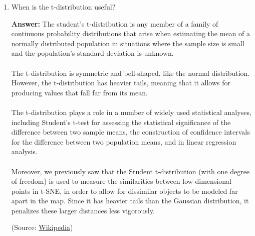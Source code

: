 \documentclass{article}
\newenvironment{QandA}{\begin{enumerate}[label=\arabic*.]}{\end{enumerate}}
\newenvironment{answer}{\par\normalfont \textbf{Answer:}}{}
\begin{document}
\begin{QandA}
    \item When is the t-distribution useful?
    \begin{answer}
        The student's t-distribution is any member of a family of continuous probability distributions that arise when estimating the mean of a normally distributed population in situations where the sample size is small and the population's standard deviation is unknown.\\\\
        The t-distribution is symmetric and bell-shaped, like the normal distribution. However, the t-distribution has heavier tails, meaning that it allows for producing values that fall far from its mean.\\\\
        The t-distribution plays a role in a number of widely used statistical analyses, including Student's t-test for assessing the statistical significance of the difference between two sample means, the construction of confidence intervals for the difference between two population means, and in linear regression analysis. \\\\
        Moreover, we previously saw that the Student t-distribution (with one degree of freedom) is used to measure the similarities between low-dimensional points in t-SNE, in order to allow for dissimilar objects to be modeled far apart in the map. Since it has heavier tails than the Gaussian distribution, it penalizes these larger distances less vigorously. 
        
        (Source: \href{https://en.wikipedia.org/wiki/Student%27s_t-distribution}{Wikipedia})
    \end{answer}
    

\end{QandA}
\end{document}
